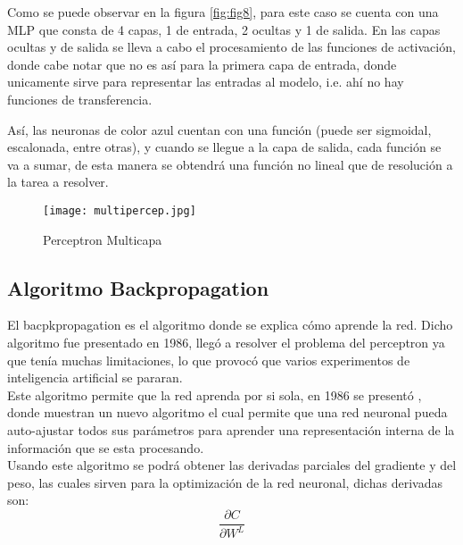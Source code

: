             Como se puede observar en la figura \eqref{fig:fig8}, para este caso se cuenta con una MLP que consta de 4 capas,  1 de entrada, 2 ocultas y 1 de salida. En las capas ocultas y de salida se lleva a cabo el procesamiento de las funciones de activación, donde cabe notar que no es así para la primera capa de entrada, donde unicamente sirve para representar las entradas al modelo, i.e. ahí no hay funciones de transferencia. 
            
Así, las neuronas de color azul cuentan con una funci\'on (puede ser sigmoidal, escalonada, entre otras), 
            y cuando se llegue a la capa de salida, cada funci\'on se va a sumar, de esta manera 
            se obtendrá una funci\'on no lineal que de resoluci\'on a la tarea a resolver.

            \begin{figure}[H]
                \centering
                \texttt{[image: multipercep.jpg]}
                \caption{Perceptron Multicapa}
                \label{fig:fig8}
            \end{figure}

            
        \subsection{Algoritmo Backpropagation}
        	
        	
        	El bacpkpropagation es el algoritmo donde se explica c\'omo aprende la red.
            Dicho algoritmo fue presentado en 1986, lleg\'o a resolver el problema del perceptron 
            ya que ten\'ia muchas limitaciones, lo que provoc\'o que varios experimentos de inteligencia
            artificial se pararan.\\

            Este algoritmo permite que la red aprenda por si sola, en 1986 se present\'o \cite{rumelhart1986}, 
            donde muestran un nuevo algoritmo el cual permite que una red neuronal pueda auto-ajustar todos sus 
            parámetros para aprender una representaci\'on interna de la informaci\'on que se esta procesando.\\

            Usando este algoritmo se podrá obtener las derivadas parciales del gradiente y del peso, las cuales
            sirven para la optimizaci\'on de la red neuronal, dichas derivadas son:
            \begin{equation*}
                \frac{\partial C}{\partial W^L}
            \end{equation*}
            
